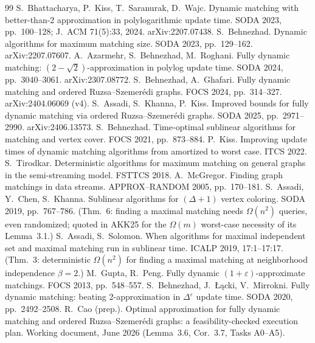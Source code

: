 \documentclass[11pt]{article}
\begin{document}
\begin{thebibliography}{99}\footnotesize
{} S.~Bhattacharya, P.~Kiss, T.~Saranurak, D.~Wajc.
Dynamic matching with better-than-2 approximation in polylogarithmic update
time. SODA 2023, pp.~100--128; J.~ACM 71(5):33, 2024. arXiv:2207.07438.
 S.~Behnezhad. Dynamic algorithms for maximum matching size.
SODA 2023, pp.~129--162. arXiv:2207.07607.
 A.~Azarmehr, S.~Behnezhad, M.~Roghani. Fully dynamic
matching: $(2-\sqrt2)$-approximation in polylog update time. SODA 2024,
pp.~3040--3061. arXiv:2307.08772.
 S.~Behnezhad, A.~Ghafari. Fully dynamic matching and ordered
Ruzsa--Szemer\'edi graphs. FOCS 2024, pp.~314--327. arXiv:2404.06069 (v4).
 S.~Assadi, S.~Khanna, P.~Kiss. Improved bounds for fully
dynamic matching via ordered Ruzsa--Szemer\'edi graphs. SODA 2025,
pp.~2971--2990. arXiv:2406.13573.
 S.~Behnezhad. Time-optimal sublinear algorithms for matching
and vertex cover. FOCS 2021, pp.~873--884.
 P.~Kiss. Improving update times of dynamic matching
algorithms from amortized to worst case. ITCS 2022.
 S.~Tirodkar. Deterministic algorithms for maximum matching
on general graphs in the semi-streaming model. FSTTCS 2018.
 A.~McGregor. Finding graph matchings in data streams.
APPROX--RANDOM 2005, pp.~170--181.
 S.~Assadi, Y.~Chen, S.~Khanna. Sublinear algorithms for
$(\Delta+1)$ vertex coloring. SODA 2019, pp.~767--786. (Thm.~6: finding a
maximal matching needs $\Omega(n^2)$ queries, even randomized; quoted in
AKK25 for the $\Omega(m)$ worst-case necessity of its Lemma~3.1.)
 S.~Assadi, S.~Solomon. When algorithms for maximal
independent set and maximal matching run in sublinear time. ICALP 2019,
17:1--17:17. (Thm.~3: deterministic $\Omega(n^2)$ for finding a maximal
matching at neighborhood independence $\beta=2$.)
 M.~Gupta, R.~Peng. Fully dynamic $(1+\varepsilon)$-approximate
matchings. FOCS 2013, pp.~548--557.
 S.~Behnezhad, J.~{\L}\k{a}cki, V.~Mirrokni. Fully dynamic
matching: beating 2-approximation in $\Delta^{\varepsilon}$ update time.
SODA 2020, pp.~2492--2508.
 R.~Cao (prep.). Optimal approximation for fully dynamic
matching and ordered Ruzsa--Szemer\'edi graphs: a feasibility-checked
execution plan. Working document, June 2026 (Lemma~3.6, Cor.~3.7,
Tasks A0--A5).
\end{thebibliography}
\end{document}
